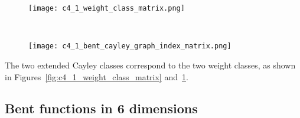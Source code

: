 \begin{figure}[!bhpt] %
\centering
\begin{minipage}{.48\textwidth}
  \centering
  \texttt{[image: c4\_1\_weight\_class\_matrix.png]}
  \label{fig:c4_1_weight_class_matrix}
\end{minipage}%
~~~~
\begin{minipage}{.48\textwidth}
  \centering
  \texttt{[image: c4\_1\_bent\_cayley\_graph\_index\_matrix.png]}
  \label{fig:c4_1_bent_cayley_graph_index_matrix}
\end{minipage}
\end{figure}
The two extended Cayley classes correspond to the two weight classes,
as shown in Figures~\ref{fig:c4_1_weight_class_matrix} and~\ref{fig:c4_1_bent_cayley_graph_index_matrix}.

\newpage
\subsection{Bent functions in 6 dimensions}
